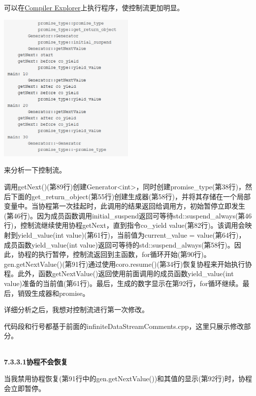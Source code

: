 可以在\href{https://godbolt.org/z/cTW9Gq}{Compiler Explorer}上执行程序，使控制流更加明显。

\begin{center}
\includegraphics[width=0.5\textwidth]{content/3/chapter7/images/14.png}\\
\end{center}

来分析一下控制流。

调用getNext()(第89行)创建Generator<int>，同时创建promise\_type(第38行)，然后下面的get\_return\_object(第55行)创建生成器(第58行)，并将其存储在一个局部变量中。当协程第一次挂起时，此调用的结果返回给调用方，初始暂停立即发生(第46行)。因为成员函数调用initial\_suspend返回可等待std::suspend\_always(第46行)，控制流继续使用协程getNext，直到指令co\_yield value(第82行)。该调用会映射到yield\_value(int value)(第61行)，当前值为current\_value = value(第64行)，成员函数yield\_value(int value)返回可等待的std::suspend\_always(第58行)。因此，协程的执行暂停，控制流返回到主函数，for循环开始(第90行)。gen.getNextValue()(第91行)通过使用coro.resume()(第34行)恢复协程来开始执行协程。此外，函数getNextValue()返回使用前面调用的成员函数yield\_value(int value)准备的当前值(第61行)。最后，生成的数字显示在第92行，for循环继续。最后，销毁生成器和promise。

详细分析之后，我想对控制流进行第一次修改。


代码段和行号都基于前面的infiniteDataStreamComments.cpp，这里只展示修改部分。

\hspace*{\fill} \\ %
\noindent
\textbf{7.3.3.1\hspace{0.2cm}协程不会恢复}

当我禁用协程恢复(第91行中的gen.getNextValue())和其值的显示(第92行)时，协程会立即暂停。

